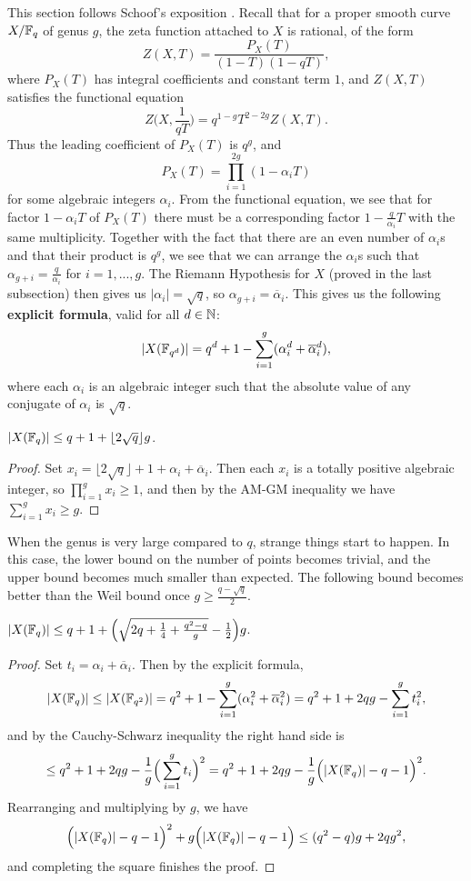 This section follows Schoof's exposition \cite{schoof}. Recall that for a proper smooth curve $X/\mathbb{F}_q$ of genus $g$, the zeta function attached to $X$ is rational, of the form
\[
Z(X,T) = \frac{P_X(T)}{(1-T)(1-qT)},
\]
where $P_X(T)$ has integral coefficients and constant term $1$, and $Z(X,T)$ satisfies the functional equation
\[
Z\Big(X,\frac{1}{qT}\Big) = q^{1-g}T^{2-2g}Z(X,T).
\]
Thus the leading coefficient of $P_X(T)$ is $q^g$, and
\[
P_X(T) = \prod_{i=1}^{2g} (1-\alpha_iT)
\]
for some algebraic integers $\alpha_i$. From the functional equation, we see that for factor $1-\alpha_iT$ of $P_X(T)$ there must be a corresponding factor $1-\frac{q}{\alpha_i}T$ with the same multiplicity. Together with the fact that there are an even number of $\alpha_i$s and that their product is $q^g$, we see that we can arrange the $\alpha_i$s such that $\alpha_{g+i} = \frac{q}{\alpha_i}$ for $i = 1, ..., g$. The Riemann Hypothesis for $X$ (proved in the last subsection) then gives us $|\alpha_i| = \sqrt{q}$, so $\alpha_{g+i} = \overline{\alpha}_i$. This gives us the following {\bf explicit formula}, valid for all $d \in \mathbb{N}$:
\[
|X(\mathbb{F}_{q^d})| = q^d + 1 - \sum_{i=1}^g (\alpha_i^d + \overline{\alpha}_i^d),
\]
where each $\alpha_i$ is an algebraic integer such that the absolute value of any conjugate of $\alpha_i$ is $\sqrt{q}$.

\begin{thm} $|X(\mathbb{F}_q)| \le q+1+\lfloor2\sqrt{q}\rfloor g$.
\end{thm}
\begin{proof} Set $x_i = \lfloor 2\sqrt{q}\rfloor + 1 + \alpha_i + \overline{\alpha}_i$. Then each $x_i$ is a totally positive algebraic integer, so $\prod_{i=1}^g x_i \ge 1$, and then by the AM-GM inequality we have $\sum_{i=1}^g x_i \ge g$.
\end{proof}

When the genus is very large compared to $q$, strange things start to happen. In this case, the lower bound on the number of points becomes trivial, and the upper bound becomes much smaller than expected. The following bound becomes better than the Weil bound once $g \ge \frac{q-\sqrt{q}}{2}$.

\begin{thm}[Ihara] $|X(\mathbb{F}_q)| \le q+1 + \Big(\sqrt{2q+\frac{1}{4} + \frac{q^2-q}{g}} - \frac{1}{2}\Big)g$.
\end{thm}
\begin{proof} Set $t_i = \alpha_i + \overline{\alpha}_i$. Then by the explicit formula,
\[
|X(\mathbb{F}_q)| \le |X(\mathbb{F}_{q^2})| = q^2 + 1 - \sum_{i=1}^g (\alpha_i^2 + \overline{\alpha}_i^2) = q^2 + 1 + 2qg - \sum_{i=1}^g t_i^2,
\]
and by the Cauchy-Schwarz inequality the right hand side is
\[
\le q^2 + 1 + 2qg - \frac{1}{g}\Big(\sum_{i=1}^g t_i\Big)^2 = q^2 + 1 + 2qg - \frac{1}{g}\Big(|X(\mathbb{F}_q)|-q-1\Big)^2.
\]
Rearranging and multiplying by $g$, we have
\[
\Big(|X(\mathbb{F}_q)|-q-1\Big)^2 + g\Big(|X(\mathbb{F}_q)|-q-1\Big) \le (q^2-q)g + 2qg^2,
\]
and completing the square finishes the proof.
\end{proof}


